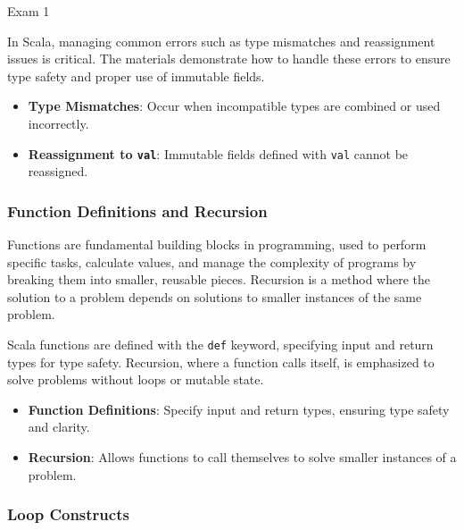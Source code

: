 \begin{examnotes}{Exam 1}
    \begin{highlight}
        In Scala, managing common errors such as type mismatches and reassignment issues is critical. The materials demonstrate how to handle these errors to ensure type safety and proper use 
        of immutable fields.
    
        \begin{itemize}
            \item \textbf{Type Mismatches}: Occur when incompatible types are combined or used incorrectly.
            \item \textbf{Reassignment to \texttt{val}}: Immutable fields defined with \texttt{val} cannot be reassigned.
        \end{itemize}
    \end{highlight}
    
    \subsubsection*{Function Definitions and Recursion}
    
    Functions are fundamental building blocks in programming, used to perform specific tasks, calculate values, and manage the complexity of programs by breaking them into smaller, reusable 
    pieces. Recursion is a method where the solution to a problem depends on solutions to smaller instances of the same problem.
    
    \begin{highlight}
        Scala functions are defined with the \texttt{def} keyword, specifying input and return types for type safety. Recursion, where a function calls itself, is emphasized to solve problems 
        without loops or mutable state.
    
        \begin{itemize}
            \item \textbf{Function Definitions}: Specify input and return types, ensuring type safety and clarity.
            \item \textbf{Recursion}: Allows functions to call themselves to solve smaller instances of a problem.
        \end{itemize}
    \end{highlight}
    
    \subsubsection*{Loop Constructs}
    

\end{examnotes}
